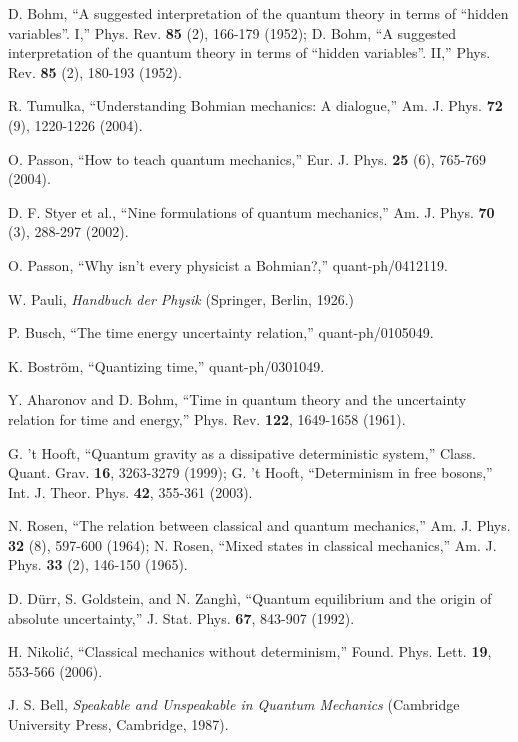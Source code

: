 \documentclass[12pt]{article}
\begin{document}
\begin{thebibliography}{99}


D. Bohm,
``A suggested interpretation of the quantum theory in terms of
``hidden variables''. I,''
Phys. Rev. {\bf 85} (2), 166-179 (1952);
D. Bohm,   
``A suggested interpretation of the quantum theory in terms of
``hidden variables''. II,''
Phys. Rev. {\bf 85} (2), 180-193 (1952).

R. Tumulka,
``Understanding Bohmian mechanics: A dialogue,''
Am. J. Phys. {\bf 72} (9), 1220-1226 (2004).
 
O. Passon, 
``How to teach quantum mechanics,''
Eur. J. Phys. {\bf 25} (6), 765-769 (2004).

D. F. Styer et al., 
``Nine formulations of quantum mechanics,''
Am. J. Phys. {\bf 70} (3), 288-297 (2002).

O. Passon,
``Why isn't every physicist a Bohmian?,''
quant-ph/0412119.

W. Pauli, {\it Handbuch der Physik}
(Springer, Berlin, 1926.)

P. Busch,
``The time energy uncertainty relation,''
quant-ph/0105049.

K. Bostr\"om,
``Quantizing time,''
quant-ph/0301049.

Y. Aharonov and D. Bohm,
``Time in quantum theory and the uncertainty relation
for time and energy,''
Phys. Rev. {\bf 122}, 1649-1658 (1961).

G. 't Hooft,
``Quantum gravity as a dissipative deterministic system,''
Class. Quant. Grav. {\bf 16}, 3263-3279 (1999);
G. 't Hooft,
``Determinism in free bosons,''
Int. J. Theor. Phys. {\bf 42}, 355-361 (2003).

N. Rosen,
``The relation between classical and quantum mechanics,''
Am. J. Phys. {\bf 32} (8), 597-600 (1964);
N. Rosen,
``Mixed states in classical mechanics,''
Am. J. Phys. {\bf 33} (2), 146-150 (1965).

D. D\"urr, S. Goldstein, and N. Zangh\`i,
``Quantum equilibrium and the origin of absolute uncertainty,''
J. Stat. Phys. {\bf 67}, 843-907 (1992).

H. Nikoli\'c,
``Classical mechanics without determinism,''
Found. Phys. Lett. {\bf 19}, 553-566 (2006).

J. S. Bell, {\it Speakable and Unspeakable in Quantum Mechanics}
(Cambridge University Press, Cambridge, 1987).


\end{thebibliography}
\end{document}
